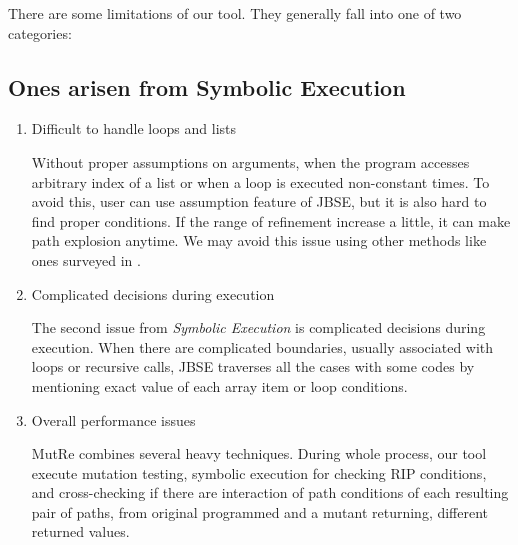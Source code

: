 \documentclass{article}
\begin{document}
\iffalse

Limitation을 여기서 서술하기(Fianl Presentation)
- Symbolic execution
    - Difficult to handle loops and lists
        - without proper assumption on arguments
    - Complicated decisions during execution
        - complicated decisions associated in loops or recursive calls with mutable lists
        - examples? -> scoville?
    - Overall performance issues
        - super heavy test generation tool
- Converting data type
    - Cannot differentiate short and char
    - Impossible to compute floating point numbers

\fi

There are some limitations of our tool. They generally fall into one of two categories:
\subsection{Ones arisen from Symbolic Execution}
\begin{enumerate}
    \item Difficult to handle loops and lists
    
    Without proper assumptions on arguments, when the program accesses arbitrary index of a list or when a loop is executed non-constant times. To avoid this, user can use assumption feature of JBSE, but it is also hard to find proper conditions. If the range of refinement increase a little, it can make path explosion anytime. We may avoid this issue using other methods like ones surveyed in \cite{path-explosion}.
    
    \item Complicated decisions during execution
    
    The second issue from \emph{Symbolic Execution} is complicated decisions during execution. When there are complicated boundaries, usually associated with loops or recursive calls, JBSE traverses all the cases with some codes by mentioning exact value of each array item or loop conditions.
    
    \item Overall performance issues
    
    MutRe combines several heavy techniques. During whole process, our tool execute mutation testing, symbolic execution for checking RIP conditions, and cross-checking if there are interaction of path conditions of each resulting pair of paths, from original programmed and a mutant returning, different returned values.
\end{enumerate}
\end{document}
